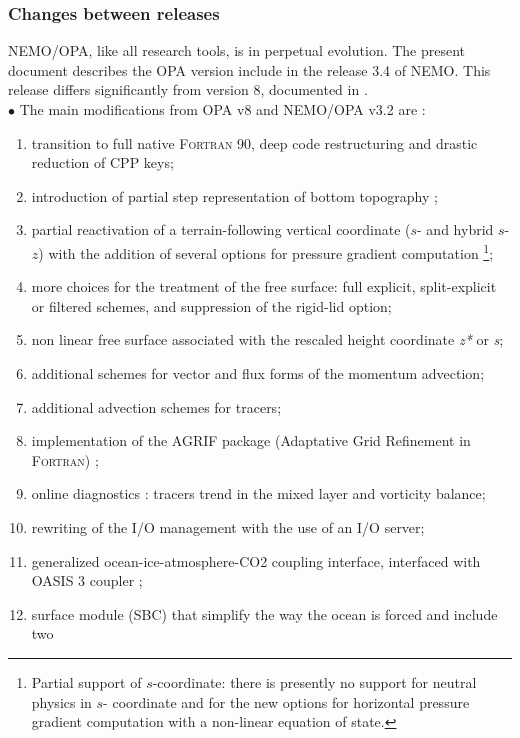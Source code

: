 \documentclass[../tex_main/NEMO_manual]{subfiles}
\begin{document}
\subsubsection{Changes between releases}
NEMO/OPA, like all research tools, is in perpetual evolution. The present document describes 
the OPA version include in the release 3.4 of NEMO.  This release differs significantly
from version 8, documented in \citet{Madec1998}.\\

$\bullet$ The main modifications from OPA v8 and NEMO/OPA v3.2 are :\\
\begin{enumerate}
\item transition to full native \textsc{Fortran} 90, deep code restructuring and drastic 
reduction of CPP keys; 
\item introduction of partial step representation of bottom topography \citep{Barnier_al_OD06, Le_Sommer_al_OM09, Penduff_al_OS07}; 
\item partial reactivation of a terrain-following vertical coordinate ($s$- and hybrid $s$-$z$) 
with the addition of several options for pressure gradient computation \footnote{Partial 
support of $s$-coordinate: there is presently no support for neutral physics in $s$-
coordinate and for the new options for horizontal pressure gradient computation with 
a non-linear equation of state.}; 
\item more choices for the treatment of the free surface: full explicit, split-explicit or filtered 
schemes, and suppression of the rigid-lid option;
\item non linear free surface associated with the rescaled height coordinate  
\textit{z*} or  \textit{s}; 
\item additional schemes for vector and flux forms of the momentum  advection; 
\item additional advection schemes for tracers; 
\item implementation of the AGRIF package (Adaptative Grid Refinement in \textsc{Fortran}) \citep{Debreu_al_CG2008}; 
\item online diagnostics : tracers trend in the mixed layer and vorticity balance;
\item rewriting of the I/O management with the use of an I/O server; 
\item generalized ocean-ice-atmosphere-CO2 coupling interface, interfaced with OASIS 3 coupler ;
\item surface module (SBC) that simplify the way the ocean is forced and include two

\end{enumerate}
\end{document}
